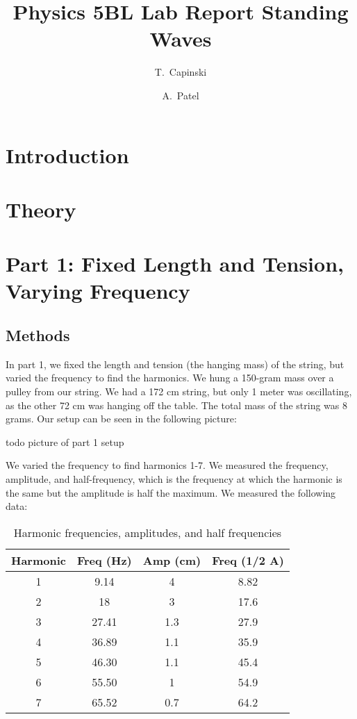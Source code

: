 \documentclass[11pt]{article}
\title{Physics 5BL Lab Report Standing Waves}
\author{T.~Capinski \and A.~Patel}
\let\oldsection\section
\renewcommand\section{\clearpage\oldsection}
\begin{document}
    \maketitle
    \tableofcontents

    \section*{Introduction}\label{sec:introduction}

    \section*{Theory}\label{sec:theory}

    \section{Part 1: Fixed Length and Tension, Varying Frequency}\label{sec:part_1}
    \subsection{Methods}\label{subsec:part_1_methods}
    In part 1, we fixed the length and tension (the hanging mass) of the string, but varied the frequency to find the harmonics. We hung a 150-gram mass over a pulley from our string. We had a 172 cm string, but only 1 meter was oscillating, as the other 72 cm was hanging off the table. The total mass of the string was 8 grams. Our setup can be seen in the following picture:

    todo picture of part 1 setup

    We varied the frequency to find harmonics 1-7. We measured the frequency, amplitude, and half-frequency, which is the frequency at which the harmonic is the same but the amplitude is half the maximum. We measured the following data:

    \begin{table}[h]
    \centering
    \begin{tabular}{|c|c|c|c|}
    \hline
    \textbf{Harmonic} & \textbf{Freq (Hz)} & \textbf{Amp (cm)} & \textbf{Freq (1/2 A)} \\
    \hline
    1 & 9.14 & 4 & 8.82 \\
    2 & 18 & 3 & 17.6 \\
    3 & 27.41 & 1.3 & 27.9 \\
    4 & 36.89 & 1.1 & 35.9 \\
    5 & 46.30 & 1.1 & 45.4 \\
    6 & 55.50 & 1 & 54.9 \\
    7 & 65.52 & 0.7 & 64.2 \\
    \hline
    \end{tabular}
    \caption{Harmonic frequencies, amplitudes, and half frequencies}
    \label{tab:harmonics}
    \end{table}
    
\end{document}
